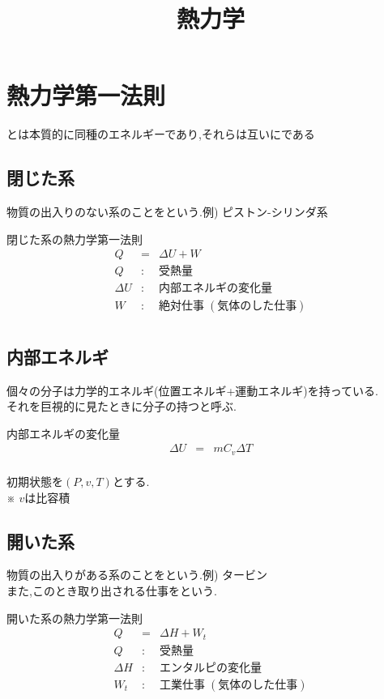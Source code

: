 \documentclass[a4paper]{jsarticle}
\author{}
\title{熱力学}
\date{}
\begin{document}
\maketitle
\tableofcontents
\newpage

\section{熱力学第一法則}
\begin{screen}
    \begin{center}
        とは本質的に同種のエネルギーであり,それらは互いにである
    \end{center}
\end{screen}
\subsection{閉じた系}
物質の出入りのない系のことをという.\quad 例) ピストン-シリンダ系
\begin{itembox}[l]{閉じた系の熱力学第一法則}
    \begin{eqnarray*}
        Q&=&\Delta U+W\\
        Q&:&受熱量\\
        \Delta U&:&内部エネルギの変化量\\
        W&:&絶対仕事 \; (気体のした仕事)\\
    \end{eqnarray*}
\end{itembox}
\subsection{内部エネルギ}
個々の分子は力学的エネルギ(位置エネルギ+運動エネルギ)を持っている.\\
それを巨視的に見たときに分子の持つと呼ぶ.
\begin{itembox}[l]{内部エネルギの変化量}
    \begin{eqnarray*}
        \Delta U&=&mC_v\Delta T\\
    \end{eqnarray*}
\end{itembox}
初期状態を$\left(P,v,T\right)$とする.\\
※ $v$は比容積
\subsection{開いた系}
物質の出入りがある系のことをという.\quad 例) タービン\\
また,このとき取り出される仕事をという.
\begin{itembox}[l]{開いた系の熱力学第一法則}
    \begin{eqnarray*}
        Q&=&\Delta H+W_t\\
        Q&:&受熱量\\
        \Delta H&:&エンタルピの変化量\\
        W_t&:&工業仕事 \; (気体のした仕事)\\
    \end{eqnarray*}
\end{itembox}
\end{document}
